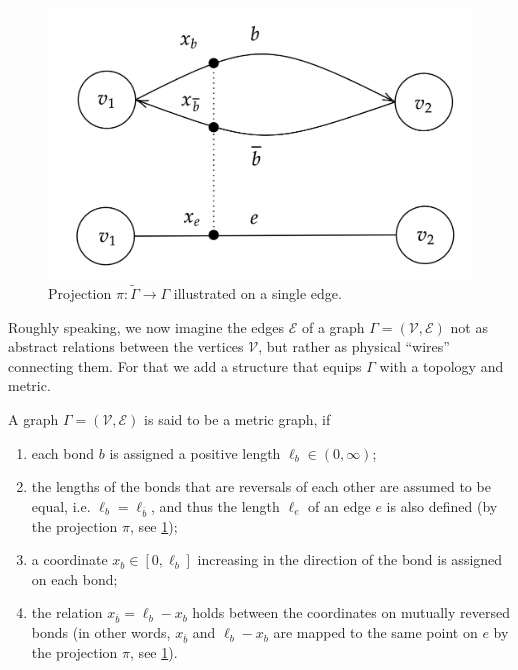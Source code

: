 \begin{figure}[H]
    \begin{center}
        \includegraphics[scale=0.2]{img/diagram-20220201_3.png}
    \end{center}
    \caption{Projection $\pi \colon \widetilde{\Gamma} \to \Gamma$ illustrated on a single edge.}
    \label{fig3}
\end{figure}

Roughly speaking, we now imagine the edges $\mathcal{E}$ of a graph $\Gamma = (\mathcal{V}, \mathcal{E})$ not as abstract relations between the vertices $\mathcal{V}$, but rather as physical “wires” connecting them. For that we add a structure that equips $\Gamma$ with a topology and metric. 

\begin{definition}
    \label{metric graph}
    A graph $\Gamma = (\mathcal{V}, \mathcal{E})$ is said to be a metric graph, if 
    \begin{enumerate}
        \item each bond $b$ is assigned a positive length $\ell_b \in (0, \infty)$;
        \item the lengths of the bonds that are reversals of each other are assumed to be equal, i.e. $\ell_b = \ell_{\overline{b}}$, and thus the length $\ell_e$ of an edge $e$ is also defined (by the projection $\pi$, see \cref{fig3});
        \item a coordinate $x_b \in [0, \ell_b]$ increasing in the direction of the bond is assigned on each bond;
        \item the relation $x_{\overline{b}} = \ell_b − x_b$ holds between the coordinates on mutually reversed bonds (in other words, $x_{\overline{b}}$ and $\ell_b − x_b$ are mapped to the same point on $e$ by the projection $\pi$, see \cref{fig3}).
    \end{enumerate}
\end{definition}


